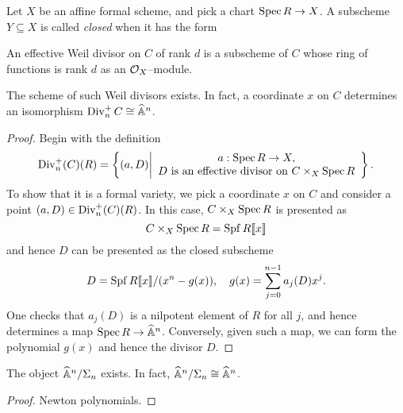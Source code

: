 \begin{definition}
Let $X$ be an affine formal scheme, and pick a chart $\operatorname{Spec} R \to X$.  A subscheme $Y \subseteq X$ is called \textit{closed} when it has the form
\begin{center}
\end{center}
\end{definition}

\begin{definition}
An effective Weil divisor on $C$ of rank $d$ is a subscheme of $C$ whose ring of functions is rank $d$ as an $\mathcal{O}_X$--module.
\end{definition}

\begin{lemma}
The scheme of such Weil divisors exists.  In fact, a coordinate $x$ on $C$ determines an isomorphism $\operatorname{Div}_n^+ C \cong \widehat{\mathbb{A}}^n$.
\end{lemma}
\begin{proof}
Begin with the definition \[\operatorname{Div}_n^+(C)(R) = \left\{(a, D) \middle| \begin{array}{c} a: \operatorname{Spec} R \to X, \\ \text{$D$ is an effective divisor on $C \times_X \operatorname{Spec} R$} \end{array} \right\}.\]  To show that it is a formal variety, we pick a coordinate $x$ on $C$ and consider a point $(a, D) \in \operatorname{Div}_n^+(C)(R)$.  In this case, $C \times_X \operatorname{Spec} R$ is presented as \[C \times_X \operatorname{Spec} R = \operatorname{Spf} R\llbracket x \rrbracket\] and hence $D$ can be presented as the closed subscheme \[D = \operatorname{Spf} R\llbracket x \rrbracket / (x^n - g(x)), \quad g(x) = \sum_{j=0}^{n-1} a_j(D) x^j.\]  One checks that $a_j(D)$ is a nilpotent element of $R$ for all $j$, and hence determines a map $\operatorname{Spec} R \to \widehat{\mathbb{A}}^n$.  Conversely, given such a map, we can form the polynomial $g(x)$ and hence the divisor $D$.
\end{proof}

\begin{lemma}
The object $\widehat{\mathbb{A}}^n / \Sigma_n$ exists.  In fact, $\widehat{\mathbb{A}}^n / \Sigma_n \cong \widehat{\mathbb{A}}^n$.
\end{lemma}
\begin{proof}
Newton polynomials.
\end{proof}

